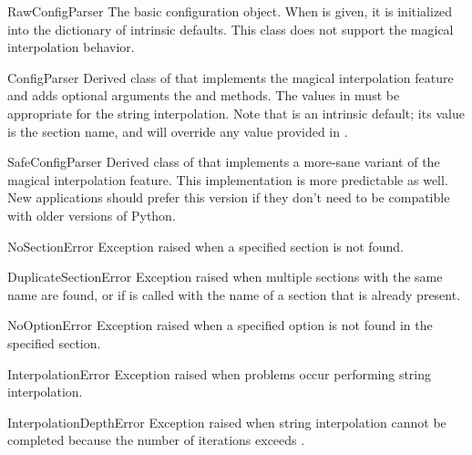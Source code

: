 \begin{classdesc}{RawConfigParser}{}
The basic configuration object.  When  is given, it is
initialized into the dictionary of intrinsic defaults.  This class
does not support the magical interpolation behavior.
\end{classdesc}

\begin{classdesc}{ConfigParser}{}
Derived class of  that implements the magical
interpolation feature and adds optional arguments the 
and  methods.  The values in  must be
appropriate for the  string interpolation.  Note that
 is an intrinsic default; its value is the section name,
and will override any value provided in .
\end{classdesc}

\begin{classdesc}{SafeConfigParser}{}
Derived class of  that implements a more-sane
variant of the magical interpolation feature.  This implementation is
more predictable as well.
New applications should prefer this version if they don't need to be
compatible with older versions of Python.
\end{classdesc}

\begin{excdesc}{NoSectionError}
Exception raised when a specified section is not found.
\end{excdesc}

\begin{excdesc}{DuplicateSectionError}
Exception raised when multiple sections with the same name are found,
or if  is called with the name of a section that 
is already present.
\end{excdesc}

\begin{excdesc}{NoOptionError}
Exception raised when a specified option is not found in the specified 
section.
\end{excdesc}

\begin{excdesc}{InterpolationError}
Exception raised when problems occur performing string interpolation.
\end{excdesc}

\begin{excdesc}{InterpolationDepthError}
Exception raised when string interpolation cannot be completed because
the number of iterations exceeds .
\end{excdesc}

